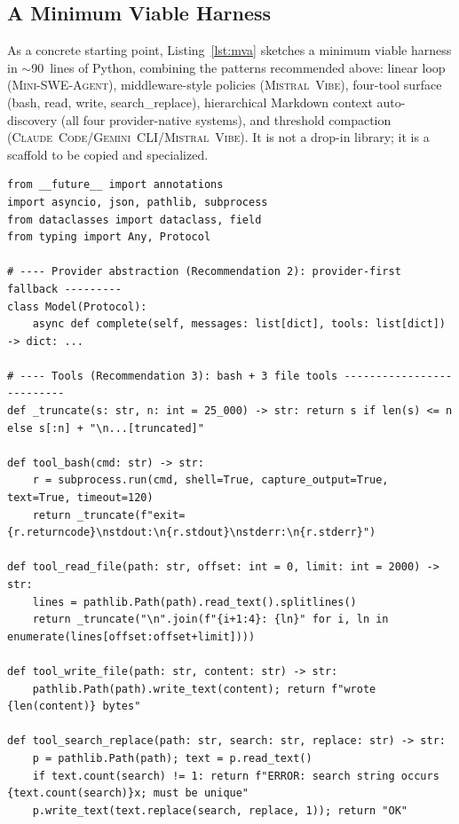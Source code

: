 \documentclass[11pt,a4paper]{article}
\newcommand{\clcode}{\textsc{Claude~Code}\xspace}
\newcommand{\mswe}{\textsc{Mini-SWE-Agent}\xspace}
\newcommand{\vibe}{\textsc{Mistral~Vibe}\xspace}
\newcommand{\gemini}{\textsc{Gemini~CLI}\xspace}
\begin{document}
\subsection{A Minimum Viable Harness}

As a concrete starting point, Listing~\ref{lst:mva} sketches a minimum viable harness in $\sim$90~lines of Python, combining the patterns recommended above: linear loop (\mswe{}), middleware-style policies (\vibe{}), four-tool surface (bash, read, write, search\_replace), hierarchical Markdown context auto-discovery (all four provider-native systems), and threshold compaction (\clcode{}/\allowbreak\gemini{}/\allowbreak\vibe{}).
It is not a drop-in library; it is a scaffold to be copied and specialized.

\begin{lstlisting}[caption={A minimum viable harness, $\sim$90~LoC Python. Illustrative scaffold, not production code.},label={lst:mva}]
from __future__ import annotations
import asyncio, json, pathlib, subprocess
from dataclasses import dataclass, field
from typing import Any, Protocol

# ---- Provider abstraction (Recommendation 2): provider-first fallback ---------
class Model(Protocol):
    async def complete(self, messages: list[dict], tools: list[dict]) -> dict: ...

# ---- Tools (Recommendation 3): bash + 3 file tools --------------------------
def _truncate(s: str, n: int = 25_000) -> str: return s if len(s) <= n else s[:n] + "\n...[truncated]"

def tool_bash(cmd: str) -> str:
    r = subprocess.run(cmd, shell=True, capture_output=True, text=True, timeout=120)
    return _truncate(f"exit={r.returncode}\nstdout:\n{r.stdout}\nstderr:\n{r.stderr}")

def tool_read_file(path: str, offset: int = 0, limit: int = 2000) -> str:
    lines = pathlib.Path(path).read_text().splitlines()
    return _truncate("\n".join(f"{i+1:4}: {ln}" for i, ln in enumerate(lines[offset:offset+limit])))

def tool_write_file(path: str, content: str) -> str:
    pathlib.Path(path).write_text(content); return f"wrote {len(content)} bytes"

def tool_search_replace(path: str, search: str, replace: str) -> str:
    p = pathlib.Path(path); text = p.read_text()
    if text.count(search) != 1: return f"ERROR: search string occurs {text.count(search)}x; must be unique"
    p.write_text(text.replace(search, replace, 1)); return "OK"


\end{lstlisting}
\end{document}
